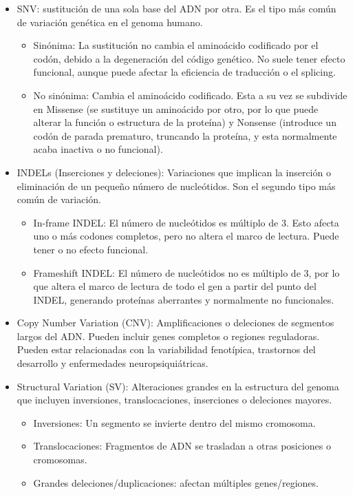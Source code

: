 \documentclass[11pt,spanish,listoffigures,listoftables]{tfgetsinf}
\begin{document}
\begin{itemize}
   \item SNV: sustitución de una sola base del \ac{ADN} por otra. Es el tipo más común de variación genética en el genoma humano. 
   \begin{itemize}
      \item Sinónima: La sustitución no cambia el aminoácido codificado por el codón, debido a la degeneración del código genético. No suele tener efecto funcional, aunque puede afectar la eficiencia de traducción o el splicing. 
      \item No sinónima: Cambia el aminoácido codificado. Esta a su vez se subdivide en Missense (se sustituye un aminoácido por otro, por lo que puede alterar la función o estructura de la proteína) y Nonsense (introduce un codón de parada prematuro, truncando la proteína, y esta normalmente acaba inactiva o no funcional). 
   \end{itemize}
   
   \item  \ac{INDEL}s (Inserciones y deleciones): Variaciones que implican la inserción o eliminación de un pequeño número de nucleótidos. Son el segundo tipo más común de variación.
   \begin{itemize}
      \item In-frame \ac{INDEL}: El número de nucleótidos es múltiplo de 3. Esto afecta uno o más codones completos, pero no altera el marco de lectura. Puede tener o no efecto funcional. 
      \item Frameshift \ac{INDEL}: El número de nucleótidos no es múltiplo de 3, por lo que altera el marco de lectura de todo el gen a partir del punto del \ac{INDEL}, generando proteínas aberrantes y normalmente no funcionales. 
   \end{itemize}
   \item Copy Number Variation (\ac{CNV}): Amplificaciones o deleciones de segmentos largos del \ac{ADN}. Pueden incluir genes completos o regiones reguladoras. Pueden estar relacionadas con la variabilidad fenotípica, trastornos del desarrollo y enfermedades neuropsiquiátricas\cite{ZHA}.
   \item Structural Variation (\ac{SV}): Alteraciones grandes en la estructura del genoma que incluyen inversiones, translocaciones, inserciones o deleciones mayores.
   \begin{itemize}
      \item Inversiones: Un segmento se invierte dentro del mismo cromosoma. 
      \item Translocaciones: Fragmentos de \ac{ADN} se trasladan a otras posiciones o cromosomas.
      \item Grandes deleciones/duplicaciones: afectan múltiples genes/regiones. 
   \end{itemize}
\end{itemize}
\end{document}
